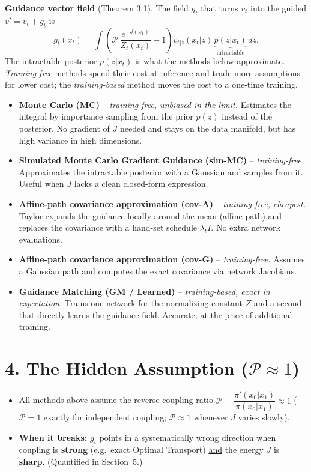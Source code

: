 \documentclass[11pt,a4paper]{article}
\begin{document}
\noindent\textbf{Guidance vector field} (Theorem 3.1). The field $g_t$ that turns $v_t$ into the guided $v' = v_t + g_t$ is
\begin{equation*}
    g_t(x_t) = \int \left( \mathcal{P}\,\frac{e^{-J(x_1)}}{Z_t(x_t)} - 1 \right) v_{t|z}(x_t|z)\, \underbrace{p(z|x_t)}_{\text{intractable}}\, dz .
\end{equation*}
The intractable posterior $p(z|x_t)$ is what the methods below approximate. \emph{Training-free} methods spend their cost at inference and trade more assumptions for lower cost; the \emph{training-based} method moves the cost to a one-time training.
\begin{itemize}[leftmargin=*, nosep]
    \item \textbf{Monte Carlo (MC)} -- \textit{training-free, unbiased in the limit.} Estimates the integral by importance sampling from the prior $p(z)$ instead of the posterior. No gradient of $J$ needed and stays on the data manifold, but has high variance in high dimensions.
    \item \textbf{Simulated Monte Carlo Gradient Guidance (sim-MC)} -- \textit{training-free.} Approximates the intractable posterior with a Gaussian and samples from it. Useful when $J$ lacks a clean closed-form expression.
    \item \textbf{Affine-path covariance approximation (cov-A)} -- \textit{training-free, cheapest.} Taylor-expands the guidance locally around the mean (affine path) and replaces the covariance with a hand-set schedule $\lambda_t I$. No extra network evaluations.
    \item \textbf{Affine-path covariance approximation (cov-G)} -- \textit{training-free.} Assumes a Gaussian path and computes the exact covariance via network Jacobians. 
    \item \textbf{Guidance Matching (GM / Learned)} -- \textit{training-based, exact in expectation.} Trains one network for the normalizing constant $Z$ and a second that directly learns the guidance field. Accurate, at the price of additional training.
\end{itemize}

\section*{4. The Hidden Assumption ($\mathcal{P} \approx 1$)}
\begin{itemize}[leftmargin=*, nosep]
    \item All methods above assume the reverse coupling ratio $\mathcal{P} = \dfrac{\pi'(x_0|x_1)}{\pi(x_0|x_1)} \approx 1$ ($\mathcal{P}=1$ exactly for independent coupling; $\mathcal{P}\approx 1$ whenever $J$ varies slowly).
    \item \textbf{When it breaks:} $g_t$ points in a systematically wrong direction when coupling is \textbf{strong} (e.g.\ exact Optimal Transport) \underline{and} the energy $J$ is \textbf{sharp}. (Quantified in Section~5.)
\end{itemize}
\end{document}
